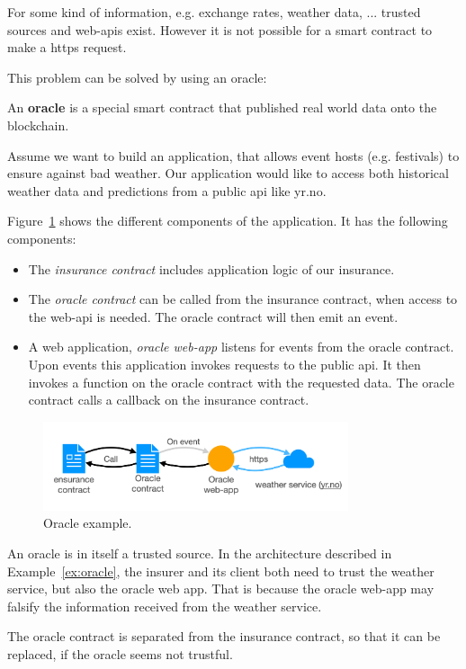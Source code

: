 For some kind of information, e.g. exchange rates, weather data, ... trusted sources and web-apis exist. 
However it is not possible for a smart contract to make a https request.

This problem can be solved by using an oracle:
\begin{definition} An \textbf{oracle} is a special smart contract that published real world data onto the blockchain.
\end{definition}

\begin{example}\label{ex:oracle}
Assume we want to build an application, that allows event hosts (e.g. festivals) to ensure against bad weather. 
Our application would like to access both historical weather data and predictions from a public api like yr.no.

Figure~\ref{fig:oracle} shows the different components of the application.
It has the following components:
\begin{itemize}
	\item The \emph{insurance contract} includes application logic of our insurance.
	\item The \emph{oracle contract} can be called from the insurance contract, when access to the web-api is needed.
	The oracle contract will then emit an event.
	\item A web application, \emph{oracle web-app} listens for events from the oracle contract. Upon events this application invokes requests to the public api. It then invokes a function on the oracle contract with the requested data.
	The oracle contract calls a callback on the insurance contract.

\end{itemize}
\begin{figure}
	\centering
	\includegraphics[width=0.8\textwidth]{fig/oracle-example}
	\caption{\label{fig:oracle}Oracle example.}
\end{figure}
\end{example}
\begin{note}
	An oracle is in itself a trusted source.
	In the architecture described in Example~\ref{ex:oracle}, the insurer and its client both need to trust the weather service, but also the oracle web app. 
	That is because the oracle web-app may falsify the information received from the weather service.
	
	The oracle contract is separated from the insurance contract, so that it can be replaced, if the oracle seems not trustful.
\end{note}


